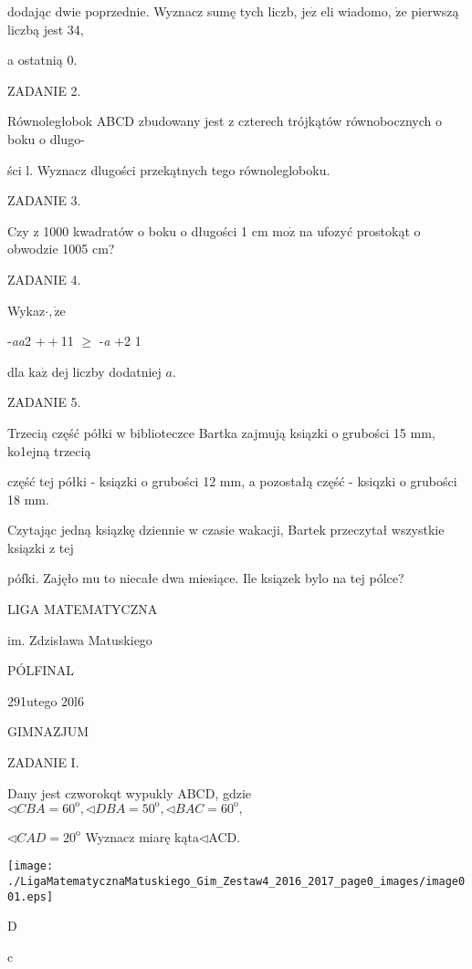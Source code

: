 \documentclass[a4paper,12pt]{article}
\begin{document}
dodając dwie poprzednie. Wyznacz sumę tych liczb, $\mathrm{j}\mathrm{e}\dot{\mathrm{z}}$ eli wiadomo, $\dot{\mathrm{z}}\mathrm{e}$ pierwszą liczbą jest 34,

a ostatnią 0.

ZADANIE 2.

Równoległobok ABCD zbudowany jest z czterech trójkątów równobocznych o boku o dlugo-

ści l. Wyznacz dlugości przekątnych tego równolegloboku.

ZADANIE 3.

Czy z 1000 kwadratów o boku o długości 1 cm $\mathrm{m}\mathrm{o}\dot{\mathrm{z}}$ na ufozyć prostokąt o obwodzie 1005 cm?

ZADANIE 4.

Wykaz$\cdot, \dot{\mathrm{z}}\mathrm{e}$

-{\it aa}2 $++$11 $\geq$ -{\it a} $+$2 1

dla $\mathrm{k}\mathrm{a}\dot{\mathrm{z}}$ dej liczby dodatniej $a.$

ZADANIE 5.

Trzecią część półki w biblioteczce Bartka zajmują ksiązki o grubości 15 mm, ko1ejną trzecią

część tej półki - ksiązki o grubości 12 mm, a pozostałą część - ksiqzki o grubości 18 mm.

Czytając jedną ksiązkę dziennie w czasie wakacji, Bartek przeczytał wszystkie ksiązki z tej

pófki. Zajęło mu to niecałe dwa miesiące. Ile ksiązek bylo na tej pólce?






LIGA MATEMATYCZNA

im. Zdzisława Matuskiego

PÓLFINAL

291utego 20l6

GIMNAZJUM

ZADANIE I.

Dany jest czworokqt wypukly ABCD, gdzie $\triangleleft CBA = 60^{\mathrm{o}}, \triangleleft DBA = 50^{\mathrm{o}}, \triangleleft BAC = 60^{\mathrm{o}},$

$\triangleleft CAD=20^{\mathrm{o}}$ Wyznacz miarę kąta$\triangleleft$ACD.
\begin{center}
\texttt{[image: ./LigaMatematycznaMatuskiego\_Gim\_Zestaw4\_2016\_2017\_page0\_images/image001.eps]}
\end{center}
D

c
\end{document}

